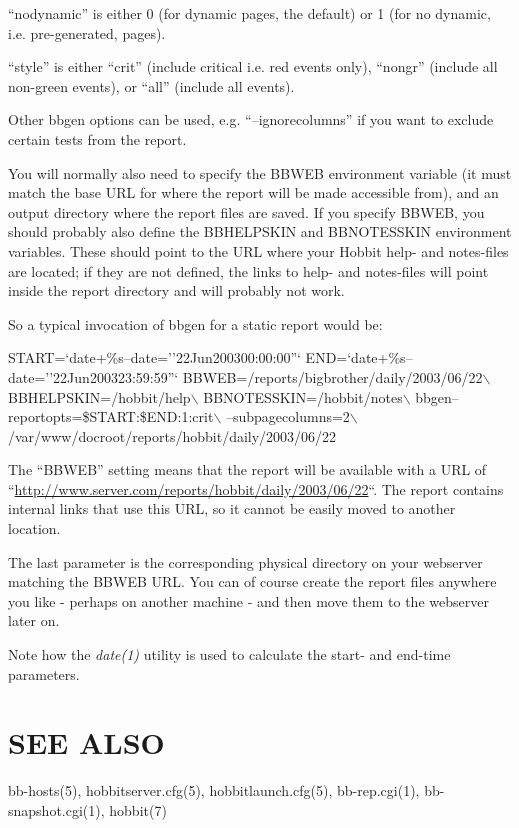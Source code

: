   ``nodynamic'' is either 0 (for dynamic pages, the default) or 1 (for no dynamic, i.e. pre-generated, pages). 


  ``style'' is either ``crit'' (include critical i.e. red events only), ``nongr'' (include all non-green events), or ``all'' (include all events). 


  Other bbgen options can be used, e.g. ``--ignorecolumns'' if you want to exclude certain tests from the report. 


  You will normally also need to specify the BBWEB environment
  variable (it must match the base URL for where the report will be
  made accessible from), and an output directory where the report
  files are saved. If you specify BBWEB, you should probably also
  define the BBHELPSKIN and BBNOTESSKIN environment variables. These
  should point to the URL where your Hobbit help- and notes-files are
  located; if they are not defined, the links to help- and notes-files
  will point inside the report directory and will probably not work. 



  So a typical invocation of bbgen for a static report would be: 


  
START=`date+\%s--date=''22Jun200300:00:00''`  
END=`date+\%s--date=''22Jun200323:59:59''`  
BBWEB=/reports/bigbrother/daily/2003/06/22$\backslash$  
BBHELPSKIN=/hobbit/help$\backslash$  
BBNOTESSKIN=/hobbit/notes$\backslash$  
bbgen--reportopts=\$START:\$END:1:crit$\backslash$  
--subpagecolumns=2$\backslash$  
/var/www/docroot/reports/hobbit/daily/2003/06/22 


  The ``BBWEB'' setting means that the report will be available with a
  URL of
  ``\url{http://www.server.com/reports/hobbit/daily/2003/06/22}``. The
  report contains internal links that use this URL, so it cannot be
  easily moved to another location. 



  The last parameter is the corresponding physical directory on your
  webserver matching the BBWEB URL. You can of course create the
  report files anywhere you like - perhaps on another machine - and
  then move them to the webserver later on. 



  Note how the \emph{date(1)}
 utility is used to calculate the start- and end-time parameters. 


 
\section{SEE ALSO}
bb-hosts(5), hobbitserver.cfg(5), hobbitlaunch.cfg(5), bb-rep.cgi(1), bb-snapshot.cgi(1), hobbit(7) 

